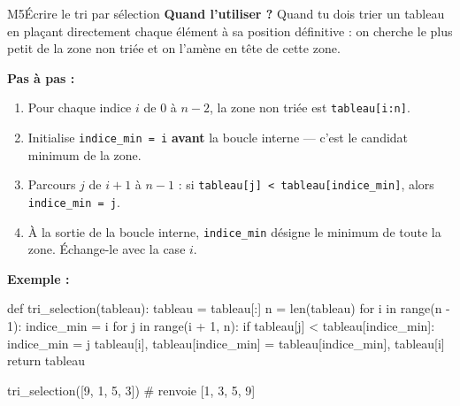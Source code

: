 \begin{fichemethode}{M5}{Écrire le tri par sélection}
\textbf{Quand l'utiliser ?} Quand tu dois trier un tableau en plaçant directement chaque
élément à sa position définitive : on cherche le plus petit de la zone non triée et on
l'amène en tête de cette zone.

\textbf{Pas à pas :}
\begin{enumerate}
  \item Pour chaque indice $i$ de $0$ à $n-2$, la zone non triée est
    \lstinline{tableau[i:n]}.
  \item Initialise \lstinline{indice_min = i} \textbf{avant} la boucle interne — c'est le
    candidat minimum de la zone.
  \item Parcours $j$ de $i+1$ à $n-1$ : si \lstinline{tableau[j] < tableau[indice_min]},
    alors \lstinline{indice_min = j}.
  \item À la sortie de la boucle interne, \lstinline{indice_min} désigne le minimum de
    toute la zone. Échange-le avec la case $i$.
\end{enumerate}

\textbf{Exemple :}
\begin{python}
def tri_selection(tableau):
    tableau = tableau[:]
    n = len(tableau)
    for i in range(n - 1):
        indice_min = i
        for j in range(i + 1, n):
            if tableau[j] < tableau[indice_min]:
                indice_min = j
        tableau[i], tableau[indice_min] = tableau[indice_min], tableau[i]
    return tableau

tri_selection([9, 1, 5, 3])   # renvoie [1, 3, 5, 9]
\end{python}


\end{fichemethode}
